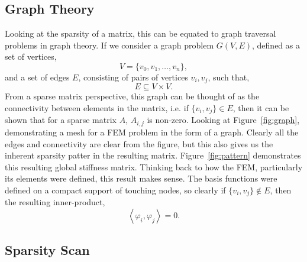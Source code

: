 \subsection{Graph Theory}

Looking at the sparsity of a matrix, this can be equated to graph traversal problems in graph theory. If we consider a graph problem $G(V,E)$, defined as a set of vertices,
\begin{equation}
	V = \{v_0,v_1,\dots,v_n\},
\end{equation}
and a set of edges $E$, consisting of pairs of vertices $v_i,v_j$, such that,
\begin{equation}
	E \subseteq V\times V.
\end{equation}
From a sparse matrix perspective, this graph can be thought of as the connectivity between elements in the matrix, i.e. if $\{v_i,v_j\} \in E$, then it can be shown that for a sparse matrix $A$, $A_{i,j}$ is non-zero. Looking at Figure~\ref{fig:graph}, demonstrating a mesh for a FEM problem in the form of a graph. Clearly all the edges and connectivity are clear from the figure, but this also gives us the inherent sparsity patter in the resulting matrix. Figure~\ref{fig:pattern} demonstrates this resulting global stiffness matrix. Thinking back to how the FEM, particularly its elements were defined, this result makes sense. The basis functions were defined on a compact support of touching nodes, so clearly if $\{v_i,v_j\} \notin E$, then the resulting inner-product,
\begin{equation}
	\left\langle \varphi_i, \varphi_j \right\rangle = 0.
\end{equation}
\cite{saad}

\subsection{Sparsity Scan}\label{sparsity}

